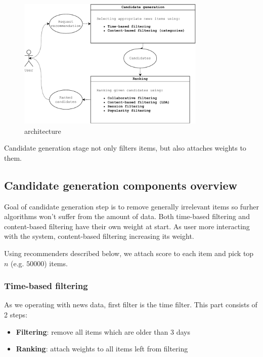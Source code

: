 \documentclass{article}
\begin{document}
\begin{figure}[h]
    \centering
    \includegraphics[width=0.8\textwidth]{./images/architechture.pdf}
    \caption{architecture}
    \label{fig:architecture}
\end{figure}

Candidate generation stage not only filters items, but also attaches weights to them.

\subsection{Candidate generation components overview}

Goal of candidate generation step is to remove generally irrelevant items so furher algorithms won't suffer from the amount of data. Both time-based filtering and content-based filtering have their own weight at start. As user more interacting with the system, content-based filtering increasing its weight.

Using recommenders described below, we attach score to each item and pick top $n$ (e.g. $50 000$) items.

\subsubsection{Time-based filtering}

As we operating with news data, first filter is the time filter. This part consists of 2 steps:

\begin{itemize}
    \item \textbf{Filtering}: remove all items which are older than 3 days
    \item \textbf{Ranking}: attach weights to all items left from filtering
\end{itemize}
\end{document}
